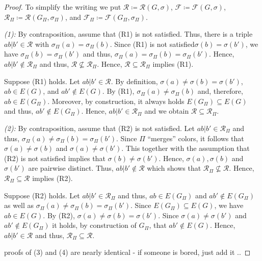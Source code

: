 \documentclass[final,3p,times]{elsarticle}
\newcommand{\TODO}[1]{\begingroup\color{red}#1\endgroup}
\newcommand{\ak}[1]{\begingroup\color{orange}#1\endgroup}
\newcommand{\OLD}[1]{\begingroup\tiny\color{gray}#1\endgroup}
\begin{document}
\begin{proof}
	To simplify the writing we put $\mathscr{R}\coloneqq \mathscr{R}(G,\sigma)$, 
	$\mathscr{F}\coloneqq \mathscr{F}(G,\sigma)$, 
	$\mathscr{R}_\Pi\coloneqq \mathscr{R}(G_\Pi,\sigma_\Pi)$, and
	$\mathscr{F}_\Pi\coloneqq \mathscr{F}(G_\Pi,\sigma_\Pi)$. 

	\emph{(1): }
	By contraposition, assume that (R1) is not satisfied. Thus, there is a
	triple $ab|b' \in \mathscr{R}$ with $\sigma_\Pi(a) =
	\sigma_\Pi(b)$. Since \OLD{(R1) is not satisfied}\ak{$\sigma(b)=\sigma(b')$}, we have
	$\sigma_\Pi(b)=\sigma_\Pi(b')$ and thus,
	$\sigma_\Pi(a)=\sigma_\Pi(b)=\sigma_\Pi(b')$. Hence, $ab|b'\notin
	\mathscr{R}_\Pi$ and thus, $\mathscr{R}
	\not\subseteq \mathscr{R}_\Pi$. Hence, $\mathscr{R}
	\subseteq \mathscr{R}_\Pi$ implies (R1).
    
    Suppose (R1) holds. Let $ab|b' \in \mathscr{R}$. By definition,
    $\sigma(a)\neq\sigma(b)=\sigma(b')$, $ab\in E(G)$, and $ab'\notin E(G)$. By
    (R1), $\sigma_\Pi(a) \neq \sigma_\Pi(b)$ and, therefore, $ab\in E(G_\Pi)$.
    Moreover, by construction, it always holds $E(G_\Pi)\subseteq E(G)$ and
    thus, $ab'\notin E(G_\Pi)$. Hence, $ab|b'\in \mathscr{R}_\Pi$
    and we obtain $\mathscr{R}\subseteq
    \mathscr{R}_\Pi$. 
    
	\emph{(2):}
	By contraposition, assume that (R2) is not satisfied. 
	Let $ab|b' \in \mathscr{R}_\Pi$ and thus, 
	$\sigma_\Pi(a)\neq \sigma_\Pi(b) = \sigma_\Pi(b')$. 
	Since $\Pi$ ``merges'' colors, it follows that 
	$\sigma(a)\neq \sigma(b)$ and $\sigma(a)\neq \sigma(b')$. 
	This together with the
	assumption that (R2) is not satisfied implies
	that $\sigma(b) \neq \sigma(b')$. Hence, 
	$\sigma(a),  \sigma(b)$ and $\sigma(b')$ are pairwise
	distinct. Thus, $ab|b' \not\in \mathscr{R}$
	which shows that $\mathscr{R}_\Pi \not\subseteq  \mathscr{R}$. 
	Hence, $\mathscr{R}_\Pi \subseteq  \mathscr{R}$ implies (R2). 
	
	Suppose (R2) holds. Let $ab|b' \in \mathscr{R}_\Pi$
	and thus, $ab\in E(G_\Pi)$ and $ab'\notin E(G_\Pi)$
	as well as $\sigma_\Pi(a)\neq\sigma_\Pi(b)=\sigma_\Pi(b')$. 
	Since $E(G_\Pi)\subseteq E(G)$, we have $ab\in E(G)$. 
	By (R2), $\sigma(a)\neq\sigma(b) = \sigma(b')$.
	Since	$\sigma(a)\neq\sigma(b')$ and
	$ab'\notin E(G_\Pi)$ it holds, by construction of $G_\Pi$, 
	that $ab'\notin E(G)$. Hence, $ab|b' \in \mathscr{R}$
	and thus, $\mathscr{R}_\Pi \subseteq  \mathscr{R}$. 
	
	
	\TODO{proofs of (3) and (4) are nearly identical - if someone
	is bored, just add it ..}
\end{proof}
\end{document}
